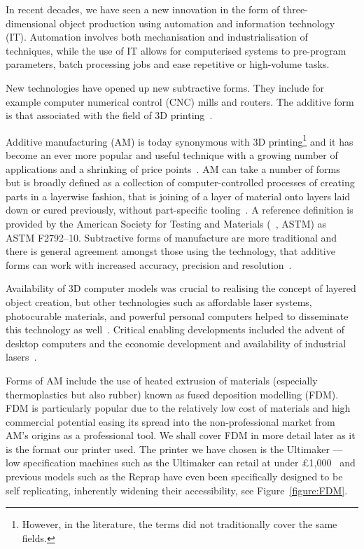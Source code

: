 \documentclass[pdftex, 11pt]{report} %
\begin{document}
In recent decades, we have seen a new innovation in the form of three-dimensional object production using automation and information technology (IT). Automation involves both mechanisation and industrialisation of techniques, while the use of IT allows for computerised systems to pre-program parameters, batch processing jobs and ease repetitive or high-volume tasks.

New technologies have opened up new subtractive forms. They include for example computer numerical control (CNC) mills and routers. The additive form is that associated with the field of 3D printing~\cite{Excell2010}. 

Additive manufacturing (AM) is today synonymous with 3D printing\footnote{However, in the literature, the terms did not traditionally cover the same fields.} and it has become an ever more popular and useful technique with a growing number of applications and a shrinking of price points~\cite{Dimitrov2006}. AM can take a number of forms~\cite{Guo2013} but is broadly defined as a collection of computer-controlled processes of creating parts in a layerwise fashion, that is joining of a layer of material onto layers laid down or cured previously, without part-specific tooling~\cite{Guo2013}. A reference definition is provided by the American Society for Testing and Materials (~\cite{ASTM}, ASTM) as ASTM F2792–10. Subtractive forms of manufacture are more traditional and there is general agreement amongst those using the technology, that additive forms can work with increased accuracy, precision and resolution~\cite{Marcus1994}.

Availability of 3D computer models was crucial to realising the concept of layered object creation, but other technologies such as affordable laser systems, photocurable materials, and powerful personal computers helped to disseminate this technology as well~\cite{ITRIInternationalTechnologyResearchInstitute1997}. Critical enabling developments included the advent of desktop computers and the economic development and availability of industrial lasers~\cite{Bourell2009}.

Forms of AM include the use of heated extrusion of materials (especially thermoplastics but also rubber) known as fused deposition modelling (FDM). FDM is particularly popular due to the relatively low cost of materials and high commercial potential easing its spread into the non-professional market from AM's origins as a professional tool. We shall cover FDM in more detail later as it is the format our printer used. The printer we have chosen is the Ultimaker --- low specification machines such as the Ultimaker can retail at under £1,000~\cite{Ultimaker2014} and previous models such as the Reprap have even been specifically designed to be self replicating, inherently widening their accessibility, see Figure~\ref{figure:FDM}.
\end{document}
